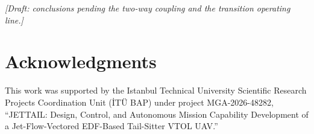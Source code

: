 \documentclass[submit]{aiaa-tc}%
\begin{document}

\emph{[Draft: conclusions pending the two-way coupling and the transition
operating line.]}

\section*{Acknowledgments}

This work was supported by the Istanbul Technical University Scientific
Research Projects Coordination Unit (\.IT\"U BAP) under project
MGA-2026-48282, ``JETTAIL: Design, Control, and Autonomous Mission
Capability Development of a Jet-Flow-Vectored EDF-Based Tail-Sitter VTOL
UAV.''




\end{document}
